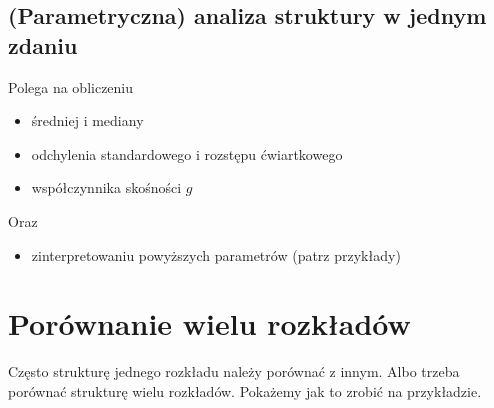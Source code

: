 \documentclass[
  openany]{book}
\providecommand{\tightlist}{%
  \setlength{\itemsep}{0pt}\setlength{\parskip}{0pt}}
\begin{document}
\hypertarget{parametryczna-analiza-struktury-w-jednym-zdaniu}{%
\subsection{(Parametryczna) analiza struktury w jednym zdaniu}\label{parametryczna-analiza-struktury-w-jednym-zdaniu}}

Polega na obliczeniu

\begin{itemize}
\item
  średniej i mediany
\item
  odchylenia standardowego i rozstępu ćwiartkowego
\item
  współczynnika skośności \(g\)
\end{itemize}

Oraz

\begin{itemize}
\tightlist
\item
  zinterpretowaniu powyższych parametrów (patrz przykłady)
\end{itemize}

\hypertarget{poruxf3wnanie-wielu-rozkux142aduxf3w}{%
\section{Porównanie wielu rozkładów}\label{poruxf3wnanie-wielu-rozkux142aduxf3w}}

Często strukturę jednego rozkładu należy porównać z innym. Albo trzeba porównać
strukturę wielu rozkładów. Pokażemy jak to zrobić na przykładzie.
\end{document}
